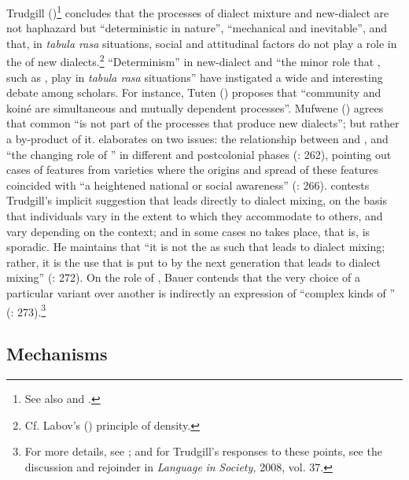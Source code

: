 \documentclass[output=paper]{langsci/langscibook}
\begin{document}
Trudgill (\citeyear[149]{Trudgill2004})\footnote{See also \citet{TrudgillEtAl2000} and \citet{Trudgill2008}.} concludes that the processes of dialect mixture and new-dialect  are not haphazard but “deterministic in nature”, “mechanical and inevitable”, and that, in \textit{tabula rasa} situations, social and attitudinal factors do not play a role in the  of new dialects.\footnote{Cf. Labov's (\citeyear{Labov2001}) principle of density.} “Determinism” in new-dialect  and “the minor role that , such as , play in \textit{tabula rasa} situations” have instigated a wide and interesting debate among scholars. For instance, Tuten (\citeyear[261]{Tuten2008}) proposes that “community   and koiné  are simultaneous and mutually dependent processes”. Mufwene (\citeyear[258]{Mufwene2008}) agrees that common  “is not part of the processes that produce new dialects”; but rather a by-product of it. \citet{Schneider2008} elaborates on two issues: the relationship between  and , and “the changing role of ” in different  and postcolonial phases (\citeyear{Schneider2008}: 262), pointing out cases of features from  varieties where the origins and spread of these features coincided with “a heightened national or social awareness” (\citeyear{Schneider2008}: 266). \citet{Bauer2008} contests Trudgill’s implicit suggestion that  leads directly to dialect mixing, on the basis that individuals vary in the extent to which they accommodate to others, and vary depending on the context; and in some cases no  takes place, that is,  is sporadic. He maintains that “it is not the  as such that leads to dialect mixing; rather, it is the use that  is put to by the next generation that leads to dialect mixing” (\citeyear{Bauer2008}: 272). On the role of , Bauer contends that the very choice of a particular variant over another is indirectly an expression of “complex kinds of ” (\citeyear{Bauer2008}: 273).\footnote{For more details, see \citet{Bauer2008}; and for Trudgill’s responses to these points, see the discussion and rejoinder in \textit{Language} \textit{in} \textit{Society,} 2008, vol. 37.}

\subsection{Mechanisms}
\end{document}
